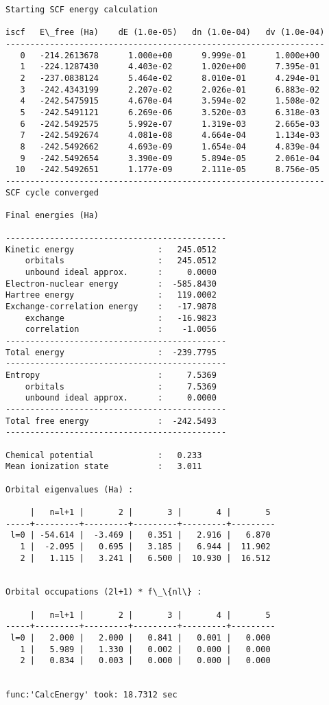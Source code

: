 \documentclass[11pt]{article}
\begin{document}
    \begin{Verbatim}[commandchars=\\\{\}]
Starting SCF energy calculation

iscf   E\_free (Ha)    dE (1.0e-05)   dn (1.0e-04)   dv (1.0e-04)
-----------------------------------------------------------------
   0   -214.2613678      1.000e+00      9.999e-01      1.000e+00
   1   -224.1287430      4.403e-02      1.020e+00      7.395e-01
   2   -237.0838124      5.464e-02      8.010e-01      4.294e-01
   3   -242.4343199      2.207e-02      2.026e-01      6.883e-02
   4   -242.5475915      4.670e-04      3.594e-02      1.508e-02
   5   -242.5491121      6.269e-06      3.520e-03      6.318e-03
   6   -242.5492575      5.992e-07      1.319e-03      2.665e-03
   7   -242.5492674      4.081e-08      4.664e-04      1.134e-03
   8   -242.5492662      4.693e-09      1.654e-04      4.839e-04
   9   -242.5492654      3.390e-09      5.894e-05      2.061e-04
  10   -242.5492651      1.177e-09      2.111e-05      8.756e-05
-----------------------------------------------------------------
SCF cycle converged

Final energies (Ha)

---------------------------------------------
Kinetic energy                 :   245.0512
    orbitals                   :   245.0512
    unbound ideal approx.      :     0.0000
Electron-nuclear energy        :  -585.8430
Hartree energy                 :   119.0002
Exchange-correlation energy    :   -17.9878
    exchange                   :   -16.9823
    correlation                :    -1.0056
---------------------------------------------
Total energy                   :  -239.7795
---------------------------------------------
Entropy                        :     7.5369
    orbitals                   :     7.5369
    unbound ideal approx.      :     0.0000
---------------------------------------------
Total free energy              :  -242.5493
---------------------------------------------

Chemical potential             :   0.233
Mean ionization state          :   3.011

Orbital eigenvalues (Ha) :

     |   n=l+1 |       2 |       3 |       4 |       5
-----+---------+---------+---------+---------+---------
 l=0 | -54.614 |  -3.469 |   0.351 |   2.916 |   6.870
   1 |  -2.095 |   0.695 |   3.185 |   6.944 |  11.902
   2 |   1.115 |   3.241 |   6.500 |  10.930 |  16.512


Orbital occupations (2l+1) * f\_\{nl\} :

     |   n=l+1 |       2 |       3 |       4 |       5
-----+---------+---------+---------+---------+---------
 l=0 |   2.000 |   2.000 |   0.841 |   0.001 |   0.000
   1 |   5.989 |   1.330 |   0.002 |   0.000 |   0.000
   2 |   0.834 |   0.003 |   0.000 |   0.000 |   0.000


func:'CalcEnergy' took: 18.7312 sec
    \end{Verbatim}
\end{document}

